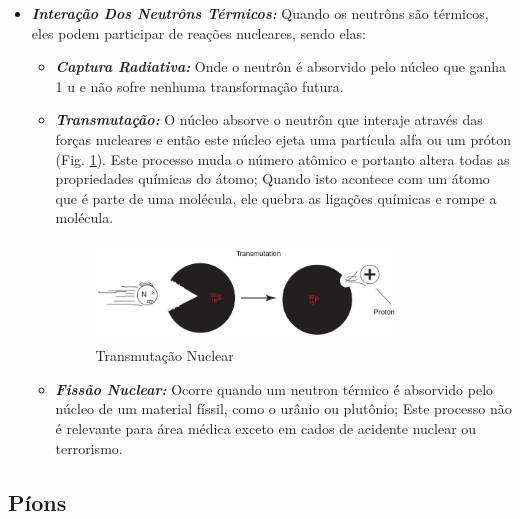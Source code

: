 \documentclass[11pt,a4paper]{article}
\begin{document}
\begin{itemize}
                \item \textbf{\textit{\textcolor{CarnationPink}{Interação Dos Neutrôns Térmicos}:}} Quando os neutrôns são térmicos, eles podem participar de reações nucleares, sendo elas:
                
                    \begin{itemize}
                        \item \textbf{\textit{\textcolor{CarnationPink}{Captura Radiativa}:}} Onde o neutrôn é absorvido pelo núcleo que ganha 1 u e não sofre nenhuma transformação futura.
                        
                        \item \textbf{\textit{\textcolor{CarnationPink}{Transmutação}:}} O núcleo absorve o neutrôn que interaje através das forças nucleares e então este núcleo ejeta uma partícula alfa ou um próton (Fig. \ref{fig:transmutacaoNuclear}). Este processo muda o número atômico e portanto altera todas as propriedades químicas do átomo; Quando isto acontece com um átomo que é parte de uma molécula, ele quebra as ligações químicas e rompe a molécula.
                        
                        \begin{figure}[h]
                            \centering
                            \includegraphics[width=0.8\textwidth]{Imagens/transmutacaoNuclear.JPG}
                            \caption{Transmutação Nuclear}
                            \label{fig:transmutacaoNuclear}                
                        \end{figure}


                        \item \textbf{\textit{\textcolor{CarnationPink}{Fissão Nuclear}:}} Ocorre quando um neutron térmico é absorvido pelo núcleo de um material físsil, como o urânio ou plutônio; Este processo não é relevante para área médica exceto em cados de acidente nuclear ou terrorismo. 
                    \end{itemize}
            \end{itemize}

        \subsection{Píons}
\end{document}
